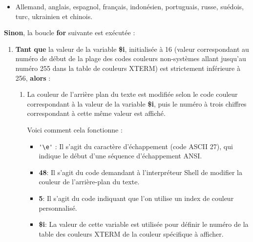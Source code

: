 \documentclass[a4paper,10pt]{article}
\begin{document}
    \begin{justify}
        \begin{itemize}
            \item Allemand, anglais, espagnol, français, indonésien, portuguais, russe, suédois, turc, ukrainien et chinois.
        \end{itemize}
    \end{justify}

    \begin{justify}
    	\textbf{\color{cond}Sinon}, la boucle \textbf{\color{loop}for} suivante est exécutée :

    	\setlength{\parskip}{.3em}

    	\begin{enumerate}
    	    \item \textbf{\color{loop}Tant que} la valeur de la variable \textbf{\color{vars}\$i}, initialisée à 16 (valeur correspondant au numéro de début de la plage des codes couleurs non-systèmes allant jusqu'au numéro 255 dans la table de couleurs XTERM) est strictement inférieure à 256, \textbf{\color{loop}alors} :

            \begin{enumerate}
                \item La couleur de l'arrière plan du texte est modifiée selon le code couleur correspondant à la valeur de la variable \textbf{\color{vars}\$i}, puis le numéro à trois chiffres correspondant à cette même valeur est affiché.

                \setlength{\parskip}{1em}

                Voici comment cela fonctionne :

                \begin{itemize}
                    \setlength{\parskip}{1em}

                    \item \verb+'\e'+ : Il s'agit du caractère d'échappement (code ASCII 27), qui indique le début d'une séquence d'échappement ANSI.

                    \item \textbf{48}: Il s'agit du code demandant à l'interpréteur Shell de modifier la couleur de l'arrière-plan du texte.

                    \item \textbf{5}: Il s'agit du code indiquant que l'on utilise un index de couleur personnalisé.

                    \item \textbf{\color{vars}\${i}}: La valeur de cette variable est utilisée pour définir le numéro de la table des couleurs XTERM de la couleur spécifique à afficher.


\end{itemize}
\end{enumerate}
\end{enumerate}
\end{justify}
\end{document}
